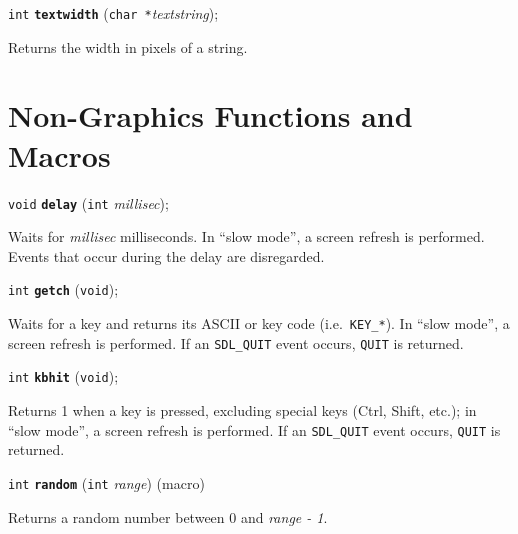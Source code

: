 \documentclass[a4paper,12pt]{article}
\newcommand{\V}{\texttt{void}}      %
\newcommand{\I}{\texttt{int}}       %
\newcommand{\C}{\texttt{char *}}    %
\newcommand{\func}[1]{\textbf{\texttt{#1}}}  %
\newcommand{\A}[1]{\emph{#1}}       %
\newcommand{\T}[1]{\texttt{#1}}     %
\newenvironment{bgi}
{ %
  \begin{snugshade}
}
{ %
  \end{snugshade}
}
\begin{document}

\label{sec:textwidth}

\begin{bgi}
\I{} \func{textwidth} (\C{}\A{textstring});
\end{bgi}

Returns the width in pixels of a string.


\section{Non-Graphics Functions and Macros}

\begin{bgi}
\V{} \func{delay} (\I{} \A{millisec});
\end{bgi}

Waits for \A{millisec} milliseconds. In ``slow mode'', a screen
refresh is performed. Events that occur during the delay are
disregarded.


\label{sec:getch}

\begin{bgi}
\I{} \func{getch} (\V{});
\end{bgi}

Waits for a key and returns its ASCII or key code (i.e.\ \T{KEY\_*}).
In ``slow mode'', a screen refresh is performed. If an \T{SDL\_QUIT}
event occurs, \T{QUIT} is returned.


\label{sec:kbhit}

\begin{bgi}
\I{} \func{kbhit} (\V{});
\end{bgi}

Returns 1 when a key is pressed, excluding special keys (Ctrl, Shift,
etc.); in ``slow mode'', a screen refresh is performed. If an
\T{SDL\_QUIT} event occurs, \T{QUIT} is returned.


\label{sec:random}

\begin{bgi}
\I{} \func{random} (\I{} \A{range}) (macro)
\end{bgi}

Returns a random number between 0 and \A{range - 1}.
\end{document}
